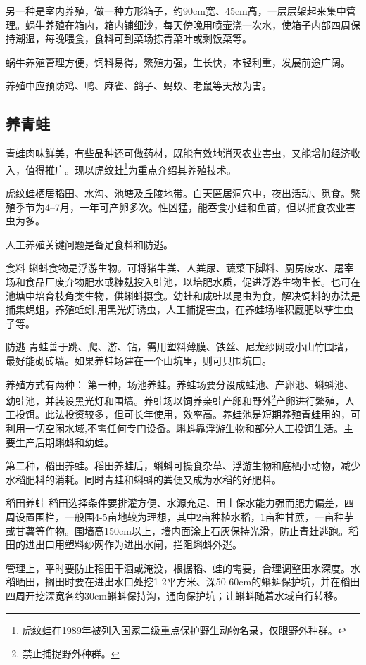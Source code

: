 \documentclass{ctexbook}
\begin{document}
另一种是室内养殖，做一种方形箱子，约90cm宽、45cm高，一层层架起来集中管理。蜗牛养殖在箱内，箱内铺细沙，每天傍晚用喷壶浇一次水，使箱子内部四周保持潮湿，每晚喂食，食料可到菜场拣青菜叶或剩饭菜等。

蜗牛养殖管理方便，饲料易得，繁殖力强，生长快，本轻利重，发展前途广阔。

养殖中应预防鸡、鸭、麻雀、鸽子、蚂蚁、老鼠等天敌为害。
\subsection{养青蛙}
青蛙肉味鲜美，有些品种还可做药材，既能有效地消灭农业害虫，又能增加经济收入，值得推广。现以虎纹蛙\footnote{虎纹蛙在1989年被列入国家二级重点保护野生动物名录，仅限野外种群。}为重点介绍其养殖技术。

虎纹蛙栖居稻田、水沟、池塘及丘陵地带。白天匿居洞穴中，夜出活动、觅食。繁殖季节为4--7月，一年可产卵多次。性凶猛，能吞食小蛙和鱼苗，但以捕食农业害虫为多。

人工养殖关键问题是备足食料和防逃。

食料 蝌蚪食物是浮游生物。可将猪牛粪、人粪尿、蔬菜下脚料、厨房废水、屠宰场和食品厂废弃物肥水或糠麸投入蛙池，以培肥水质，促进浮游生物生长。也可在池塘中培育枝角类生物，供蝌蚪摄食。幼蛙和成蛙以昆虫为食，解决饲料的办法是捕集蝇蛆，养殖蚯蚓,用黑光灯诱虫，人工捕捉害虫，在养蛙场堆积厩肥以孳生虫子等。

防逃 青蛙善于跳、爬、游、钻，需用塑料薄膜、铁丝、尼龙纱网或小山竹围墙，最好能砌砖墙。如果养蛙场建在一个山坑里，则可只围坑口。

养殖方式有两种：
第一种，场池养蛙。养蛙场要分设成蛙池、产卵池、蝌蚪池、幼蛙池，并装设黑光灯和围墙。养蛙场以饲养亲蛙产卵和野外\footnote{禁止捕捉野外种群。}产卵进行繁殖，人工投饵。此法投资较多，但可长年使用，效率高。养蛙池是短期养殖青蛙用的，可利用一切空闲水域,不需任何专门设备。蝌蚪靠浮游生物和部分人工投饵生活。主要生产后期蝌蚪和幼蛙。

第二种，稻田养蛙。稻田养蛙后，蝌蚪可摄食杂草、浮游生物和底栖小动物，减少水稻肥料的消耗。同时青蛙和蝌蚪的粪便又成为水稻的好肥料。

稻田养蛙 稻田选择条件要排灌方便、水源充足、田土保水能力强而肥力偏差，四周设置围栏，一般围4-5亩地较为理想，其中2亩种植水稻，1亩种甘蔗，一亩种芋或甘薯等作物。围墙高150cm以上，墙内面涂上石灰保持光滑，防止青蛙逃跑。稻田的进出口用塑料纱网作为进出水闸，拦阻蝌蚪外逃。

管理上，平时要防止稻田干涸或淹没，根据稻、蛙的需要，合理调整田水深度。水稻晒田，搁田时要在进出水口处挖1-2平方米、深50-60cm的蝌蚪保护坑，并在稻田四周开挖深宽各约30cm蝌蚪保持沟，通向保护坑；让蝌蚪随着水域自行转移。
\end{document}
